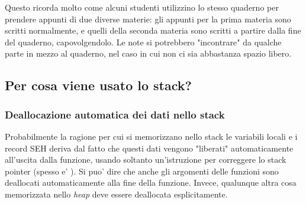 Questo ricorda molto come alcuni studenti utilizzino lo stesso quaderno per prendere appunti di due diverse materie:
gli appunti per la prima materia sono scritti normalmente, e quelli della seconda materia sono scritti a partire dalla fine del quaderno, capovolgendolo.
Le note si potrebbero "incontrare" da qualche parte in mezzo al quaderno, nel caso in cui non ci sia abbastanza spazio libero.


\subsection{Per cosa viene usato lo stack?}



\EN{}
\RU{}
\PTBR{}




\subsubsection{Deallocazione automatica dei dati nello stack}

Probabilmente la ragione per cui si memorizzano nello stack le variabili locali e i record SEH deriva dal fatto che questi dati vengono "liberati" automaticamente all'uscita dalla funzione,
usando soltanto un'istruzione per correggere lo stack pointer (spesso e' \ADD).
Si puo' dire che anche gli argomenti delle funzioni sono deallocati automaticamente alla fine della funzione.
Invece, qualunque altra cosa memorizzata nello \emph{heap} deve essere deallocata esplicitamente.

\EN{}
\RU{}
\PTBR{}


